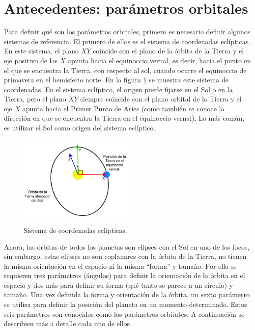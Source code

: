 \documentclass[a4paper,10pt]{article}
\begin{document}
\section{Antecedentes: parámetros orbitales}
Para definir qué son los parámetros orbitales, primero es necesario definir algunos sistemas de referencia. El primero de ellos es el sistema de coordenadas eclípticas. En este sistema, el plano $XY$ coincide con el plano de la órbita de la Tierra y el eje positivo de las $X$ apunta hacia el equinoccio vernal, es decir, hacia el punto en el que se encuentra la Tierra, con respecto al sol, cuando ocurre el equinoccio de primavera en el hemisferio norte. En la figura \ref{fig:EclipticFrame} se muestra este sistema de coordenadas. En el sistema eclíptico, el origen puede fijarse en el Sol o en la Tierra, pero el plano $XY$ siempre coincide con el plano orbital de la Tierra y el eje $X$ apunta hacia el Primer Punto de Aries (como también se conoce la dirección en que se encuentra la Tierra en el equinoccio vernal). Lo más común, es utilizar el Sol como origen del sistema eclíptico. 
\begin{figure}
  \centering
  \includegraphics[width=0.5\textwidth]{Figures/EclipticCoordinates.pdf}
  \caption{Sistema de coordenadas eclípticas.}
  \label{fig:EclipticFrame}
\end{figure}

Ahora, las órbitas de todos los planetas son elipses con el Sol en uno de los focos, sin embargo, estas elipses no son coplanares con la órbita de la Tierra, no tienen la misma orientación en el espacio ni la misma ``forma'' y tamaño. Por ello se requieren tres parámetros (ángulos) para definir la orientación de la órbita en el espacio y dos más para definir su forma (qué tanto se parece a un círculo) y tamaño. Una vez definida la forma y orientación de la órbita, un sexto parámetro se utiliza para definir la posición del planeta en un momento determinado. Estos seis parámetros son conocidos como los parámetros orbitates. A continuación se describien más a detalle cada uno de ellos.
\end{document}
